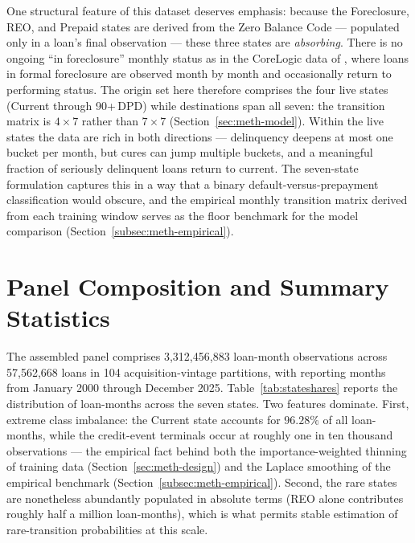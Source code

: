 One structural feature of this dataset deserves emphasis: because the
Foreclosure, REO, and Prepaid states are derived from the Zero
Balance Code --- populated only in a loan's final observation ---
these three states are \emph{absorbing}.  There is no ongoing ``in
foreclosure'' monthly status as in the CoreLogic data of
\citet{sirignano2021}, where loans in formal foreclosure are observed
month by month and occasionally return to performing status.  The
origin set here therefore comprises the four live states (Current
through 90+\,DPD) while destinations span all seven: the transition
matrix is $4\times 7$ rather than $7\times 7$
(Section~\ref{sec:meth-model}).  Within the live states the data are
rich in both directions --- delinquency deepens at most one bucket
per month, but cures can jump multiple buckets, and a meaningful
fraction of seriously delinquent loans return to current.  The
seven-state formulation captures this in a way that a binary
default-versus-prepayment classification would obscure, and the
empirical monthly transition matrix derived from each training window
serves as the floor benchmark for the model comparison
(Section~\ref{subsec:meth-empirical}).

\section{Panel Composition and Summary Statistics}
\label{sec:data-summary}

The assembled panel comprises 3{,}312{,}456{,}883 loan-month
observations across 57{,}562{,}668 loans in 104 acquisition-vintage
partitions, with reporting months from January 2000 through December
2025.  Table~\ref{tab:stateshares} reports the distribution of
loan-months across the seven states.  Two features dominate.  First,
extreme class imbalance: the Current state accounts for $96.28\%$ of
all loan-months, while the credit-event terminals occur at roughly
one in ten thousand observations --- the empirical fact behind both
the importance-weighted thinning of training data
(Section~\ref{sec:meth-design}) and the Laplace smoothing of the
empirical benchmark (Section~\ref{subsec:meth-empirical}).  Second,
the rare states are nonetheless abundantly populated in absolute
terms (REO alone contributes roughly half a million loan-months),
which is what permits stable estimation of rare-transition
probabilities at this scale.

